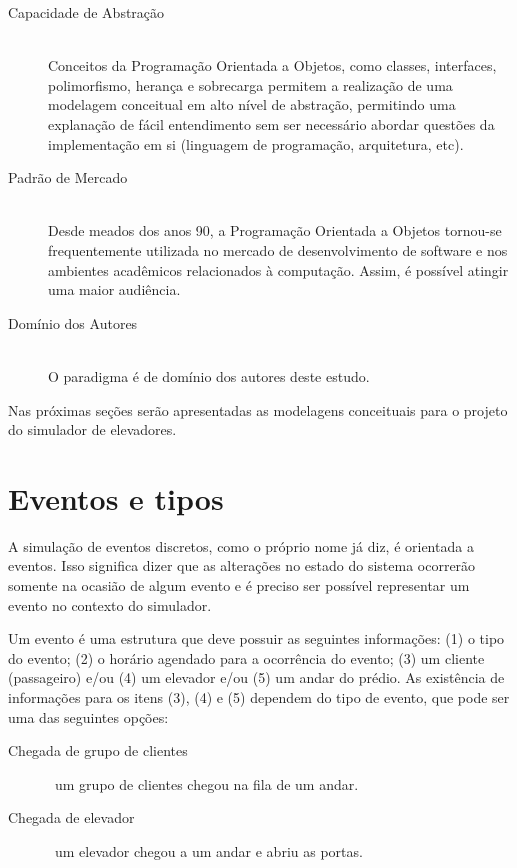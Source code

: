\begin{description}
  \item[Capacidade de Abstração]\hfill \\
    Conceitos da Programação Orientada a Objetos, como classes, interfaces,
    polimorfismo, herança e sobrecarga permitem a realização de uma modelagem
    conceitual em alto nível de abstração, permitindo uma explanação de fácil
    entendimento sem ser necessário abordar questões da implementação em si
    (linguagem de programação, arquitetura, etc).
  \item[Padrão de Mercado]\hfill \\
    Desde meados dos anos 90, a Programação Orientada a Objetos tornou-se
    frequentemente utilizada no mercado de desenvolvimento de software e nos
    ambientes acadêmicos relacionados à computação. Assim, é possível atingir
    uma maior audiência.
  \item[Domínio dos Autores]\hfill \\
    O paradigma é de domínio dos autores deste estudo.
\end{description}

Nas próximas seções serão apresentadas as modelagens conceituais para o projeto
do simulador de elevadores.

\section{\label{sec:eventos-e-tipos}Eventos e tipos}

A simulação de eventos discretos, como o próprio nome já diz, é orientada a
eventos. Isso significa dizer que as alterações no estado do sistema ocorrerão
somente na ocasião de algum evento e é preciso ser possível representar um
evento no contexto do simulador.

Um evento é uma estrutura que deve possuir as seguintes informações: (1) o tipo
do evento; (2) o horário agendado para a ocorrência do evento; (3) um cliente
(passageiro) e/ou (4) um elevador e/ou (5) um andar do prédio. As existência de
informações para os itens (3), (4) e (5) dependem do tipo de evento, que pode
ser uma das seguintes opções:

\begin{description}
  \item[Chegada de grupo de clientes] \hfill \ um grupo de clientes chegou na fila de um andar.
  \item[Chegada de elevador] \hfill \ um elevador chegou a um andar e abriu as portas.
\end{description}

